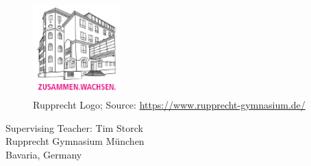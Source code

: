 \begin{titlepage}
    \begin{center}
        \vspace*{4cm}
        \Huge
       \textbf{\MakeUppercase\thetitle}
       \vspace{2cm}

       \textbf{\theauthor}

       \vfill
            
       \vspace{0.8cm}
        \begin{figure}[!ht]
            \centering
            \includegraphics[width=0.3\textwidth]{images/rupprechtLogo.png}
            \captionsetup{textformat=empty,labelformat=empty}
            \caption{Rupprecht Logo; Source: \url{https://www.rupprecht-gymnasium.de/}}
        \end{figure}
       
       
       \Large    
       Supervising Teacher: Tim Storck\\
       Rupprecht Gymnasium München\\
       Bavaria, Germany\\
       \thedate
       \vspace{0.5cm}
        
    \thispagestyle{empty}
    \setcounter{page}{0}
    \end{center}
\end{titlepage}